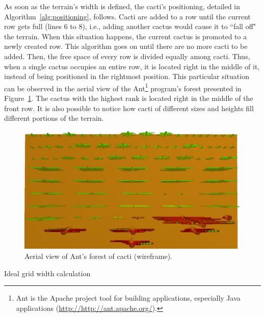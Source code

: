 As soon as the terrain's width is defined,  the cacti's positioning, detailed in
Algorithm~\ref{alg:positioning}, follows. Cacti are added to a row until the
current row gets full (lines 6 to 8), i.e., adding another cactus would cause it
to ``fall off" the terrain. When this situation happens, the current cactus is
promoted to a newly created row. This algorithm goes on until there are no more
cacti to be added. Then, the free space of every row is divided equally among
cacti. Thus, when a single cactus occupies an entire row, it is located right in
the middle of it, instead of being positioned in the rightmost position. This
particular situation can be observed in the aerial view of the Ant\footnote{Ant
is the Apache project tool for building applications, especially Java
applications (\url{http://http://ant.apache.org/}).} program's forest presented
in Figure~\ref{fig:ant_wireframe_overview}. The cactus with the highest rank is
located right in the middle of the front row. It is also possible to notice how
cacti of different sizes and heights fill different portions of the terrain.

\begin{figure}
  \centering
    \includegraphics[width=\linewidth]{figures/ant_wireframe_overview}
  \caption{Aerial view of  Ant's forest of cacti (wireframe).}
  \label{fig:ant_wireframe_overview}
\end{figure}

\begin{algorithm}[htbp]
\BlankLine
{}
\caption{Ideal grid width calculation}
\label{alg:terraindim}
\end{algorithm}

